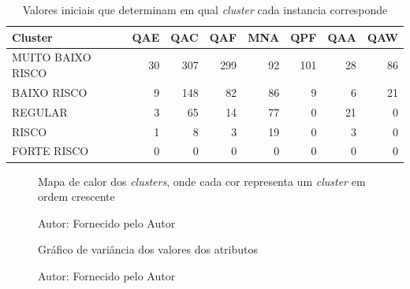 \begin{table}[!ht]
\centering
\caption{Valores iniciais que determinam em qual \textit{cluster} cada instancia corresponde}
\vspace{0.5cm}
\begin{tabular}{l|r|r|r|r|r|r|r|} 
Cluster & QAE & QAC & QAF & MNA & QPF & QAA & QAW\\
\hline
MUITO BAIXO RISCO & 30 & 307 & 299 & 92 & 101 & 28 & 86\\
BAIXO RISCO & 9 & 148 & 82 & 86 & 9 & 6 & 21\\
REGULAR & 3 & 65 & 14 & 77 & 0 & 21 & 0\\
RISCO & 1 & 8 & 3 & 19 & 0 & 3 & 0\\
FORTE RISCO & 0 & 0 & 0 & 0 & 0 & 0 & 0\\
\end{tabular}
\label{tab:modelo_clusterizado_valores}
\end{table}

\begin{figure}[!ht]
\caption{Mapa de calor dos \textit{clusters}, onde cada cor representa um \textit{cluster} em ordem crescente}
\centering
{}
\caption*{Autor: Fornecido pelo Autor}
\label{fig:mapa_calor}
\end{figure}

\begin{figure}[!ht]
\caption{Gráfico de variância dos valores dos atributos}
\centering
{}
\caption*{Autor: Fornecido pelo Autor}
\label{fig:variancia}
\end{figure}

